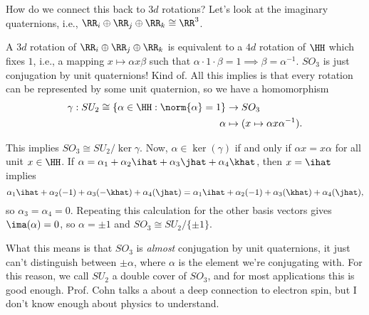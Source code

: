 How do we connect this back to $3d$ rotations? Let's look at the imaginary quaternions, i.e., $\RR_i\oplus\RR_j\oplus \RR_k\cong \RR^3$.

A $3d$ rotation of $\RR_i\oplus\RR_j\oplus \RR_k$ is equivalent to a $4d$ rotation of $\HH$ which fixes $1$, i.e., a mapping $x\mapsto \alpha x\beta$ such that $\alpha\cdot 1\cdot \beta = 1\implies \beta = \alpha^{-1}$. $SO_3$ is just conjugation by unit quaternions! Kind of. All this implies is that every rotation can be represented by some unit quaternion, so we have a homomorphism 
\begin{align*}
    \gamma : SU_2\cong \{\alpha\in \HH: \norm{\alpha}=1\}&\rightarrow SO_3 \\
    \alpha &\mapsto (x\mapsto \alpha x\alpha^{-1}).
\end{align*}

This implies $SO_3\cong SU_2/\ker{\gamma}$. Now, $\alpha\in \ker(\gamma)$ if and only if $\alpha x = x\alpha$ for all unit $x\in \HH$. If $\alpha = \alpha_1 + \alpha_2\ihat + \alpha_3\jhat + \alpha_4\khat$, then $x=\ihat$ implies 
\[\alpha_1\ihat + \alpha_2(-1) + \alpha_3(-\khat) + \alpha_4(\jhat) = \alpha_1\ihat + \alpha_2(-1) + \alpha_3(\khat) + \alpha_4(\jhat),\]
so $\alpha_3 = \alpha_4 = 0$. Repeating this calculation for the other basis vectors gives $\ima(\alpha)=0$, so $\alpha=\pm 1$ and $SO_3\cong SU_2/\{\pm 1\}$. 

What this means is that $SO_3$ is \textit{almost} conjugation by unit quaternions, it just can't distinguish between $\pm \alpha$, where $\alpha$ is the element we're conjugating with. For this reason, we call $SU_2$ a \ac{double cover} of $SO_3$, and for most applications this is good enough. Prof. Cohn talks a about a deep connection to electron spin, but I don't know enough about physics to understand. 